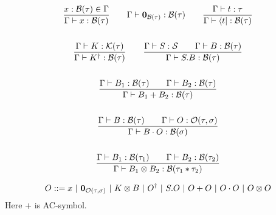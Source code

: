 \begin{definition}
\begin{definition}
  \begin{gather*}
    \frac{x : \mathcal{B}(\tau) \in \Gamma}{\Gamma \vdash x : \mathcal{B}(\tau)}
    \qquad
    \Gamma \vdash \mathbf{0}_{\mathcal{B}(\tau)} : \mathcal{B}(\tau)
    \qquad
    \frac{\Gamma \vdash t : \tau}{\Gamma \vdash \langle t| : \mathcal{B}(\tau)} \\
    \\
    \frac{\Gamma \vdash K : \mathcal{K}(\tau)}{\Gamma \vdash K^\dagger : \mathcal{B}(\tau)}
    \qquad
    \frac{\Gamma \vdash S : \mathcal{S} \qquad \Gamma \vdash B : \mathcal{B}(\tau)}{\Gamma \vdash S.B : \mathcal{B}(\tau)} \\
    \\
    \frac{\Gamma \vdash B_1 : \mathcal{B}(\tau) \qquad \Gamma \vdash B_2 : \mathcal{B}(\tau)}{\Gamma \vdash B_1 + B_2 : \mathcal{B}(\tau)} \\
    \\
    \frac{\Gamma \vdash B : \mathcal{B}(\tau) \qquad \Gamma \vdash O : \mathcal{O}(\tau, \sigma)}{\Gamma \vdash B \cdot O : \mathcal{B}(\sigma)} \\
    \\
    \frac{\Gamma \vdash B_1 : \mathcal{B}(\tau_1) \qquad \Gamma \vdash B_2 : \mathcal{B}(\tau_2)}{\Gamma \vdash B_1 \otimes B_2 : \mathcal{B}(\tau_1 * \tau_2)}
  \end{gather*}
\end{definition}


\begin{definition}
  \begin{align*}
    O ::= x\ |\ \zeroO{\tau, \sigma}\ |\ K \otimes B\ |\ O^\dagger\ |\ S.O\ |\ O + O\ |\ O \cdot O\ |\ O \otimes O
  \end{align*}
  Here $+$ is AC-symbol.
\end{definition}


\end{definition}
